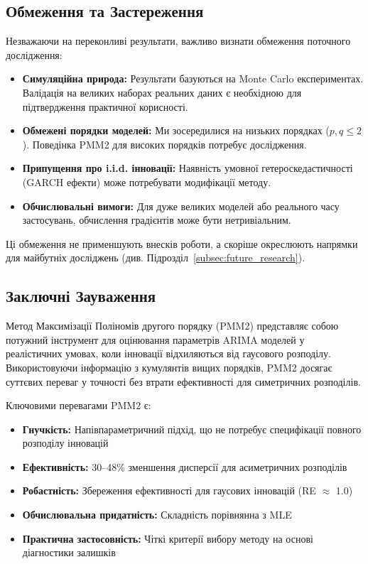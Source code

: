 \documentclass[12pt,a4paper]{article}
\begin{document}
	\subsection{Обмеження та Застереження}
	\label{subsec:caveats}
	
	Незважаючи на переконливі результати, важливо визнати обмеження поточного дослідження:
	
	\begin{itemize}
		\item \textbf{Симуляційна природа:} Результати базуються на Monte Carlo експериментах. Валідація на великих наборах реальних даних є необхідною для підтвердження практичної корисності.
		
		\item \textbf{Обмежені порядки моделей:} Ми зосередилися на низьких порядках ($p, q \leq 2$). Поведінка PMM2 для високих порядків потребує дослідження.
		
		\item \textbf{Припущення про i.i.d. інновації:} Наявність умовної гетероскедастичності (GARCH ефекти) може потребувати модифікації методу.
		
		\item \textbf{Обчислювальні вимоги:} Для дуже великих моделей або реального часу застосувань, обчислення градієнтів може бути нетривіальним.
	\end{itemize}
	
	Ці обмеження не применшують внесків роботи, а скоріше окреслюють напрямки для майбутніх досліджень (див. Підрозділ~\ref{subsec:future_research}).
	
	\subsection{Заключні Зауваження}
	\label{subsec:final_remarks}
	
	Метод Максимізації Поліномів другого порядку (PMM2) представляє собою потужний інструмент для оцінювання параметрів ARIMA моделей у реалістичних умовах, коли інновації відхиляються від гаусового розподілу. Використовуючи інформацію з кумулянтів вищих порядків, PMM2 досягає суттєвих переваг у точності без втрати ефективності для симетричних розподілів.
	
	Ключовими перевагами PMM2 є:
	\begin{itemize}
		\item \textbf{Гнучкість:} Напівпараметричний підхід, що не потребує специфікації повного розподілу інновацій
		\item \textbf{Ефективність:} 30--48\% зменшення дисперсії для асиметричних розподілів
		\item \textbf{Робастність:} Збереження ефективності для гаусових інновацій (RE $\approx$ 1.0)
		\item \textbf{Обчислювальна придатність:} Складність порівнянна з MLE
		\item \textbf{Практична застосовність:} Чіткі критерії вибору методу на основі діагностики залишків
	\end{itemize}
	
\end{document}
